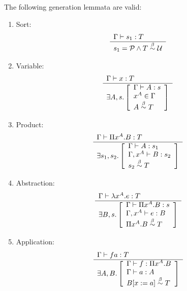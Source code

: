 \begin{theorem}
    \label{GenerationLemmata}
    The following generation lemmata are valid:
    \begin{enumerate}
    \item Sort:
        $$
        \begin{array}{l} 
            \Gamma \vdash s_1 : T
         \\ \hline 
            s_1 = {\cal P} \land T \stackrel{\beta}{\sim} {\cal U}
        \end{array}
        $$

    \item Variable:
        $$
        \begin{array}{l} 
            \Gamma \vdash x : T
         \\ \hline 
            \exists A,s .
            \left[
            \begin{array}{l}
                \Gamma \vdash A : s
                \\
                x^A \in \Gamma
                \\
                A \stackrel{\beta}{\sim} T
            \end{array}
            \right]
        \end{array}
        $$

    \item Product:
        $$
        \begin{array}{l} 
            \Gamma \vdash \Pi x^A.B : T
         \\ \hline 
            \exists s_1, s_2.
            \left[
            \begin{array}{l}
                \Gamma \vdash A: s_1
                \\
                \Gamma, x^A \vdash B: s_2
                \\
                s_2 \stackrel{\beta}{\sim} T
            \end{array}
            \right]
        \end{array}
        $$

    \item Abstraction:
        $$
        \begin{array}{l} 
            \Gamma \vdash \lambda x^A. e : T
         \\ \hline 
            \exists B, s.
            \left[
            \begin{array}{l}
                \Gamma \vdash \Pi x^A. B: s
                \\
                \Gamma, x^A \vdash e: B
                \\
                \Pi x^A. B  \stackrel{\beta}{\sim} T
            \end{array}
            \right]
        \end{array}
        $$

    \item Application:
        $$
        \begin{array}{l} 
            \Gamma \vdash f a: T
         \\ \hline 
            \exists A, B.
            \left[
            \begin{array}{l}
                \Gamma \vdash f : \Pi x^A. B
                \\
                \Gamma \vdash a : A
                \\
                B[x:=a]  \stackrel{\beta}{\sim} T
            \end{array}
            \right]
        \end{array}
        $$
    \end{enumerate}


\end{theorem}
